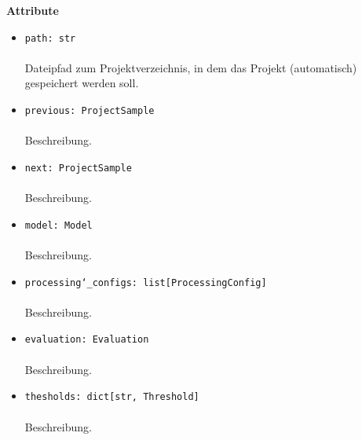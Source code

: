 \documentclass{article}
\begin{document}
\textbf{Attribute}
\begin{itemize}\setlength\itemsep{3em}
\item \texttt{path: str}\\\\
Dateipfad zum Projektverzeichnis, in dem das Projekt (automatisch) gespeichert werden soll.
\item \texttt{previous: ProjectSample}\\\\
Beschreibung.
\item \texttt{next: ProjectSample}\\\\
Beschreibung.
\item \texttt{model: Model}\\\\
Beschreibung.
\item \texttt{processing\char`_configs: list[ProcessingConfig]}\\\\
Beschreibung.
\item \texttt{evaluation: Evaluation}\\\\
Beschreibung.
\item \texttt{thesholds: dict[str, Threshold]}\\\\
Beschreibung.
\\\\
\end{itemize}
\end{document}
